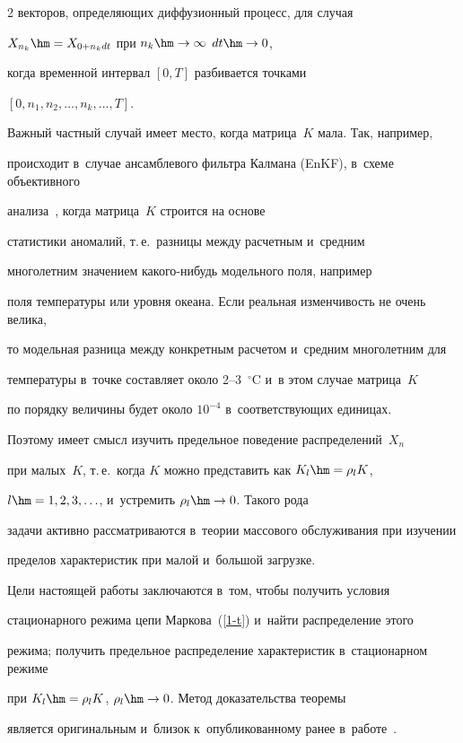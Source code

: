 \begin{multicols}{2}
векторов, определяющих диффузионный процесс, для случая

$X_{n_k}\hm=X_{0+n_k dt}$ при $n_k \hm\rightarrow \infty $ $dt \hm\rightarrow 0$,

когда временной интервал $[0,T]$ разбивается точками

$[0, n_1, n_2, \ldots, n_k, \ldots, T]$.



Важный частный случай имеет место, когда мат\-ри\-ца~$K$ мала. Так, например,

происходит в~случае  ансамблевого фильтра Калмана (EnKF), в~схеме объективного

анализа~\cite{Jazwinski, Evensen2}, когда матрица~$K$ строится на основе

статистики аномалий, т.\,е.\ разницы между расчетным и~средним

многолетним значением ка\-ко\-го-ни\-будь модельного поля, например

поля температуры или уровня океана. Если реальная изменчивость не очень велика,

то модельная разница между конкретным расчетом и~средним многолетним для

температуры в~точке составляет около 2--3~$^\circ$C и~в этом случае матрица~$K$

по порядку величины будет около $10^{-4}$ в~соответствующих единицах.

Поэтому имеет смысл изучить предельное поведение распределений~$X_n$

при малых~$K$, т.\,е.\ когда $K$ можно представить как $K_l\hm=\rho_l K$,

$l\hm=1, 2, 3, \ldots$, и~устремить $\rho_l\hm\rightarrow 0$. Такого рода

задачи активно рассматриваются в~теории массового обслуживания при изучении

пределов характеристик при малой и~большой загрузке.



Цели настоящей работы заключаются в~том, чтобы  получить условия

стационарного режима цепи Маркова~(\ref{1-t}) и~найти распределение этого

режима; получить предельное распределение характеристик в~стационарном режиме

при $K_l\hm=\rho_l K$, $\rho_l\hm\rightarrow 0$. Метод доказательства  теоремы

является оригинальным и~близок к~опубликованному ранее в~работе~\cite{Belyaev2}.






\end{multicols}
